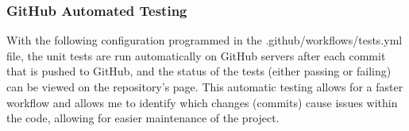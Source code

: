 \documentclass[./project-report/src/latex/project-report.tex]{subfiles}
\begin{document}
\subsubsection{GitHub Automated Testing}

With the following configuration programmed in the .github/workflows/tests.yml file, the unit tests are run automatically on GitHub servers after each commit that is pushed to GitHub, 
and the status of the tests (either passing or failing) can be viewed on the repository's page. This automatic testing allows for a faster workflow and allows me to identify which changes 
(commits) cause issues within the code, allowing for easier maintenance of the project.

\inputminted{yaml}{./.github/workflows/tests.yml}
\end{document}

